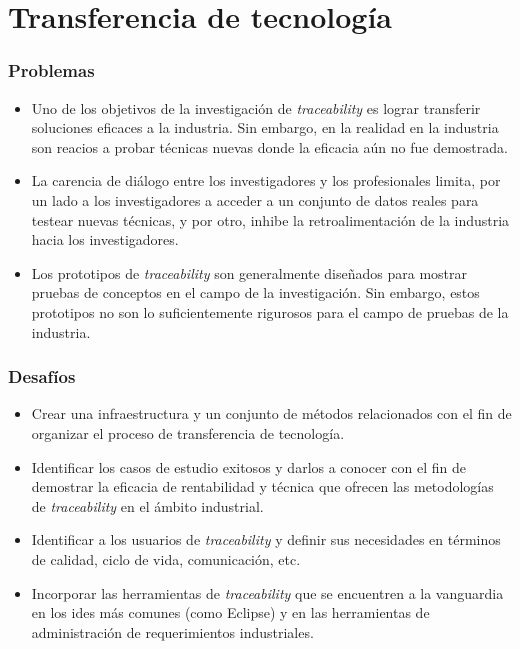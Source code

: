 \documentclass[a4paper,12pt,twoside,spanish,openright]{book}
\begin{document}
\section{Transferencia de tecnología}

\subsubsection{Problemas}

\begin{itemize}[label={$\times$}]

\item Uno de los objetivos de la investigación de \textit{traceability} es lograr transferir soluciones eficaces a la industria. Sin embargo, en la realidad en la industria son reacios a probar técnicas nuevas donde la eficacia aún no fue demostrada.

\item La carencia de diálogo entre los investigadores y los profesionales limita, por un lado a los investigadores a acceder a un conjunto de datos reales para testear nuevas técnicas, y por otro, inhibe la retroalimentación de la industria hacia los investigadores.

\item Los prototipos de \textit{traceability} son generalmente diseñados para mostrar pruebas de conceptos en el campo de la investigación. Sin embargo, estos prototipos no son lo suficientemente rigurosos para el campo de pruebas de la industria.

\end{itemize}

\subsubsection{Desafíos}

\begin{itemize}[label={\checkmark}]

\item Crear una infraestructura y un conjunto de métodos relacionados con el fin de organizar el proceso de transferencia de tecnología.

\item Identificar los casos de estudio exitosos y darlos a conocer con el fin de demostrar la eficacia de rentabilidad y técnica que ofrecen las metodologías de \textit{traceability} en el ámbito industrial.

\item Identificar a los usuarios de \textit{traceability} y definir sus necesidades en términos de calidad, ciclo de vida, comunicación, etc.

\item Incorporar las herramientas de \textit{traceability} que se encuentren a la vanguardia en los \glspl{ide} más comunes (como \textsf{Eclipse}) y en las herramientas de administración de requerimientos industriales.

\end{itemize}
\end{document}
